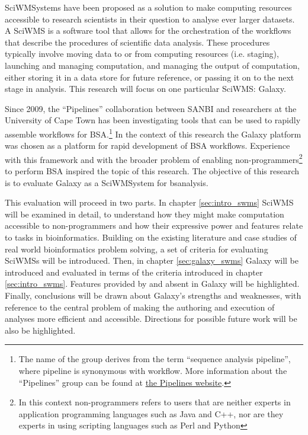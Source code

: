 \documentclass[a4paper,10pt]{scrreprt} \usepackage[utf8]{inputenc}
\begin{document}
\Glspl{SciWMSystem} have been proposed as a solution to make computing resources accessible to research scientists in their question to analyse ever larger datasets. \cite{deelman_workflows_2009} A \gls{SciWMS} is a software tool that allows for the orchestration of the \glspl{workflow} that describe the procedures of scientific data analysis. These procedures typically involve moving data to or from computing resources (i.e. staging), launching and managing computation, and managing the output of computation, either storing it in a data store for future reference, or passing it on to the next stage in analysis. This research will focus on one particular \gls{SciWMS}: Galaxy.


Since 2009, the ``Pipelines'' collaboration between SANBI \cite{pipelines_working_group_bio-analysis_2011} and researchers at the University of Cape Town has been investigating tools that can be used to rapidly assemble \glspl{workflow} for \gls{BSA}.\footnote{The name of the group derives from the term ``sequence analysis pipeline'', where pipeline is synonymous with workflow. More information about the ``Pipelines'' group can be found at \href{https://pipelines.sanbi.ac.za}{the Pipelines website}.} In the context of this research the Galaxy platform \cite{giardine_galaxy:_2005} was chosen as a platform for rapid development of \gls{BSA} \glspl{workflow}. Experience with this framework and with the broader problem of enabling non-programmers\footnote{In this context non-programmers refers to users that are neither experts in application programming languages such as Java and C++, nor are they experts in using scripting languages such as Perl and Python} to perform \gls{BSA} inspired the topic of this 
research. The objective of this research is to evaluate Galaxy as a \gls{SciWMSystem} for \gls{bsanalysis}.

This evaluation will proceed in two parts. In chapter \ref{sec:intro_swms} \gls{SciWMS} will be examined in detail, to understand how they might make computation accessible to non-programmers and how their expressive power and features relate to tasks in bioinformatics. Building on the existing literature and case studies of real world bioinformatics problem solving, a set of criteria for evaluating \glspl{SciWMS} will be introduced. Then, in chapter \ref{sec:galaxy_swms} Galaxy will be introduced and evaluated in terms of the criteria introduced in chapter \ref{sec:intro_swms}. Features provided by and absent in Galaxy will be highlighted. Finally, conclusions will be drawn about Galaxy's strengths and weaknesses, with reference to the central problem of making the authoring and execution of analyses more efficient and accessible. Directions for possible future work will be also be highlighted.
\end{document}
